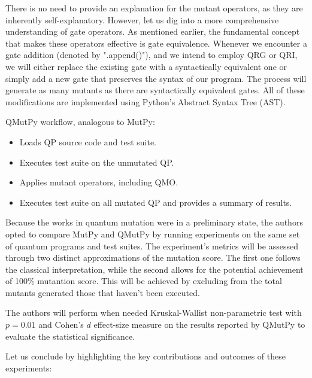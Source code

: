 \begin{itemize}
There is no need to provide an explanation for the mutant operators, as they are inherently self-explanatory.  However, let us dig into a more comprehensive understanding of gate operators. As mentioned earlier, the fundamental concept that makes these operators effective is gate equivalence. Whenever we encounter a gate addition (denoted by ".append()"), and we intend to employ QRG or QRI, we will either replace the existing gate with a syntactically equivalent one or simply add a new gate that preserves the syntax of our program. The process will generate as many mutants as there are syntactically equivalent gates. All of these modifications are implemented using Python's Abstract Syntax Tree (AST).\newline

QMutPy workflow, analogous to MutPy:
\begin{itemize}
    \item Loads QP source code and test suite.
    \item Executes test suite on the unmutated QP.
    \item Applies mutant operators, including QMO.
    \item Executes test suite on all mutated QP and provides a summary of results.
\end{itemize}

Because the works in quantum mutation \cite{wang2021qdiff}\cite{mendiluze2021muskit}\cite{ali2021assessing} were in a preliminary state, the authors opted to compare MutPy and QMutPy by running experiments on the same set of quantum programs and test suites. The experiment's metrics will be assessed through two distinct approximations of the mutation score. The first one follows the classical interpretation\cite{jia2010analysis}, while the second allows for the potential achievement of 100\% mutantion score. This will be achieved by excluding from the total mutants generated those that haven't been executed.\newline

The authors will perform when needed Kruskal-Wallist non-parametric test with $p=0.01$ and Cohen's $d$ effect-size measure on the results reported by QMutPy to evaluate the statistical significance.\newline

Let us conclude by highlighting the key contributions and outcomes of these experiments:


\end{itemize}
